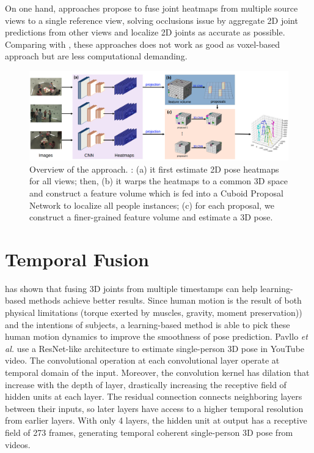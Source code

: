 On one hand, approaches \cite{multiviewpose, epipolartransformers} propose to fuse joint heatmaps from multiple source views to a single reference view, solving occlusions issue by aggregate 2D joint predictions from other views and localize 2D joints as accurate as possible. Comparing with \cite{iskakov2019learnable, voxelpose}, these approaches does not work as good as voxel-based approach but are less computational demanding.
\begin{figure}
	\centering
	\includegraphics[width=1.0\columnwidth]{figures/ch3/overview-voxelpose.png}
	\caption{Overview of the \cite{voxelpose} approach. : (a) it first estimate 2D pose heatmaps for all views; then, (b) it warps the heatmaps to a common 3D space and construct a feature volume which is fed into a Cuboid Proposal Network to localize all people instances; (c) for each proposal, we construct a finer-grained feature volume and estimate a 3D pose.} 
	\label{fig:ch3-overview-voxelpose}
\end{figure}
\section{Temporal Fusion}
\cite{julieta2017motion, pavllo:videopose3d:2019} has shown that fusing 3D joints from multiple timestamps can help learning-based methods achieve better results. Since human motion is the result of both physical limitations (torque exerted by muscles, gravity,
moment preservation)) and the intentions of subjects, a learning-based method is able to pick these human motion dynamics to improve the smoothness of pose prediction. Pavllo \textit{et al.} \cite{pavllo:videopose3d:2019} use a ResNet-like architecture to estimate single-person 3D pose in YouTube video. The convolutional operation at each convolutional layer operate at temporal domain of the input. Moreover, the convolution kernel has dilation that increase with the depth of layer, drastically increasing the receptive field of hidden units at each layer. The residual connection connects neighboring layers between their inputs, so later layers have access to a higher temporal resolution from earlier layers. With only 4 layers, the hidden unit at output has a receptive field of 273 frames, generating temporal coherent single-person 3D pose from videos.

